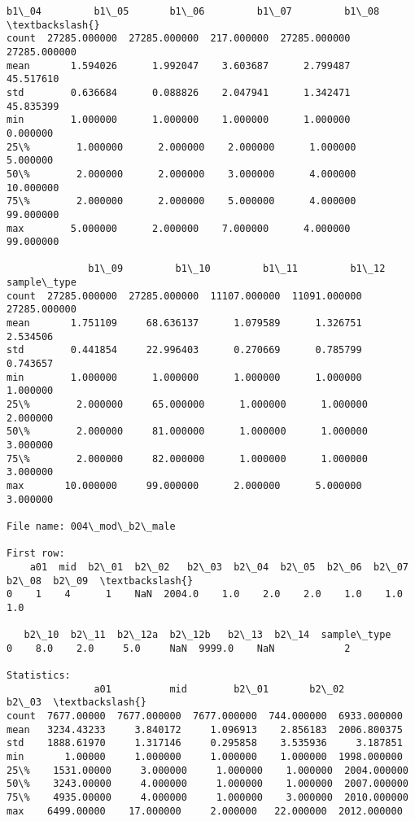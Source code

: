 \documentclass[11pt]{article}
\begin{document}
\begin{Verbatim}[commandchars=\\\{\}]
              b1\_04         b1\_05       b1\_06         b1\_07         b1\_08  \textbackslash{}
count  27285.000000  27285.000000  217.000000  27285.000000  27285.000000   
mean       1.594026      1.992047    3.603687      2.799487     45.517610   
std        0.636684      0.088826    2.047941      1.342471     45.835399   
min        1.000000      1.000000    1.000000      1.000000      0.000000   
25\%        1.000000      2.000000    2.000000      1.000000      5.000000   
50\%        2.000000      2.000000    3.000000      4.000000     10.000000   
75\%        2.000000      2.000000    5.000000      4.000000     99.000000   
max        5.000000      2.000000    7.000000      4.000000     99.000000   

              b1\_09         b1\_10         b1\_11         b1\_12   sample\_type  
count  27285.000000  27285.000000  11107.000000  11091.000000  27285.000000  
mean       1.751109     68.636137      1.079589      1.326751      2.534506  
std        0.441854     22.996403      0.270669      0.785799      0.743657  
min        1.000000      1.000000      1.000000      1.000000      1.000000  
25\%        2.000000     65.000000      1.000000      1.000000      2.000000  
50\%        2.000000     81.000000      1.000000      1.000000      3.000000  
75\%        2.000000     82.000000      1.000000      1.000000      3.000000  
max       10.000000     99.000000      2.000000      5.000000      3.000000  

File name: 004\_mod\_b2\_male

First row: 
    a01  mid  b2\_01  b2\_02   b2\_03  b2\_04  b2\_05  b2\_06  b2\_07  b2\_08  b2\_09  \textbackslash{}
0    1    4      1    NaN  2004.0    1.0    2.0    2.0    1.0    1.0    1.0   

   b2\_10  b2\_11  b2\_12a  b2\_12b   b2\_13  b2\_14  sample\_type  
0    8.0    2.0     5.0     NaN  9999.0    NaN            2  

Statistics: 
               a01          mid        b2\_01       b2\_02        b2\_03  \textbackslash{}
count  7677.00000  7677.000000  7677.000000  744.000000  6933.000000   
mean   3234.43233     3.840172     1.096913    2.856183  2006.800375   
std    1888.61970     1.317146     0.295858    3.535936     3.187851   
min       1.00000     1.000000     1.000000    1.000000  1998.000000   
25\%    1531.00000     3.000000     1.000000    1.000000  2004.000000   
50\%    3243.00000     4.000000     1.000000    1.000000  2007.000000   
75\%    4935.00000     4.000000     1.000000    3.000000  2010.000000   
max    6499.00000    17.000000     2.000000   22.000000  2012.000000   


\end{Verbatim}
\end{document}
